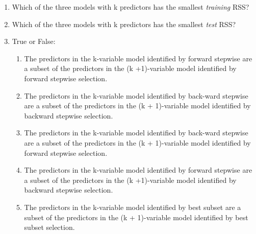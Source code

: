 \documentclass[12pt]{article}
\begin{document}
\begin{enumerate}
    \item Which of the three models with k predictors has the smallest \emph{training} RSS?
    \item Which of the three models with k predictors has the smallest \emph{test} RSS?
    \item True or False:
          \begin{enumerate}[label=(\roman*)]
              \item The predictors in the k-variable model identified by forward stepwise are a subset of the predictors in the (k +1)-variable model identified by forward stepwise selection.
              \item The predictors in the k-variable model identified by back-ward stepwise are a subset of the predictors in the (k + 1)-variable model identified by backward stepwise selection.
              \item The predictors in the k-variable model identified by back-ward stepwise are a subset of the predictors in the (k + 1)-variable model identified by forward stepwise selection.
              \item The predictors in the k-variable model identified by forward stepwise are a subset of the predictors in the (k +1)-variable model identified by backward stepwise selection.
              \item The predictors in the k-variable model identified by best subset are a subset of the predictors in the (k + 1)-variable model identified by best subset selection.
          \end{enumerate}
\end{enumerate}

\end{document}
